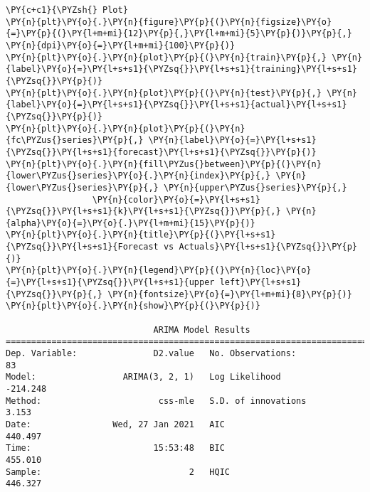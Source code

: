 \begin{tcolorbox}[breakable, size=fbox, boxrule=1pt, pad at break*=1mm,colback=cellbackground, colframe=cellborder]
\begin{Verbatim}[commandchars=\\\{\}]
\PY{c+c1}{\PYZsh{} Plot}
\PY{n}{plt}\PY{o}{.}\PY{n}{figure}\PY{p}{(}\PY{n}{figsize}\PY{o}{=}\PY{p}{(}\PY{l+m+mi}{12}\PY{p}{,}\PY{l+m+mi}{5}\PY{p}{)}\PY{p}{,} \PY{n}{dpi}\PY{o}{=}\PY{l+m+mi}{100}\PY{p}{)}
\PY{n}{plt}\PY{o}{.}\PY{n}{plot}\PY{p}{(}\PY{n}{train}\PY{p}{,} \PY{n}{label}\PY{o}{=}\PY{l+s+s1}{\PYZsq{}}\PY{l+s+s1}{training}\PY{l+s+s1}{\PYZsq{}}\PY{p}{)}
\PY{n}{plt}\PY{o}{.}\PY{n}{plot}\PY{p}{(}\PY{n}{test}\PY{p}{,} \PY{n}{label}\PY{o}{=}\PY{l+s+s1}{\PYZsq{}}\PY{l+s+s1}{actual}\PY{l+s+s1}{\PYZsq{}}\PY{p}{)}
\PY{n}{plt}\PY{o}{.}\PY{n}{plot}\PY{p}{(}\PY{n}{fc\PYZus{}series}\PY{p}{,} \PY{n}{label}\PY{o}{=}\PY{l+s+s1}{\PYZsq{}}\PY{l+s+s1}{forecast}\PY{l+s+s1}{\PYZsq{}}\PY{p}{)}
\PY{n}{plt}\PY{o}{.}\PY{n}{fill\PYZus{}between}\PY{p}{(}\PY{n}{lower\PYZus{}series}\PY{o}{.}\PY{n}{index}\PY{p}{,} \PY{n}{lower\PYZus{}series}\PY{p}{,} \PY{n}{upper\PYZus{}series}\PY{p}{,} 
                 \PY{n}{color}\PY{o}{=}\PY{l+s+s1}{\PYZsq{}}\PY{l+s+s1}{k}\PY{l+s+s1}{\PYZsq{}}\PY{p}{,} \PY{n}{alpha}\PY{o}{=}\PY{o}{.}\PY{l+m+mi}{15}\PY{p}{)}
\PY{n}{plt}\PY{o}{.}\PY{n}{title}\PY{p}{(}\PY{l+s+s1}{\PYZsq{}}\PY{l+s+s1}{Forecast vs Actuals}\PY{l+s+s1}{\PYZsq{}}\PY{p}{)}
\PY{n}{plt}\PY{o}{.}\PY{n}{legend}\PY{p}{(}\PY{n}{loc}\PY{o}{=}\PY{l+s+s1}{\PYZsq{}}\PY{l+s+s1}{upper left}\PY{l+s+s1}{\PYZsq{}}\PY{p}{,} \PY{n}{fontsize}\PY{o}{=}\PY{l+m+mi}{8}\PY{p}{)}
\PY{n}{plt}\PY{o}{.}\PY{n}{show}\PY{p}{(}\PY{p}{)}

                             ARIMA Model Results
==============================================================================
Dep. Variable:               D2.value   No. Observations:                   83
Model:                 ARIMA(3, 2, 1)   Log Likelihood                -214.248
Method:                       css-mle   S.D. of innovations              3.153
Date:                Wed, 27 Jan 2021   AIC                            440.497
Time:                        15:53:48   BIC                            455.010
Sample:                             2   HQIC                           446.327


\end{Verbatim}
\end{tcolorbox}
